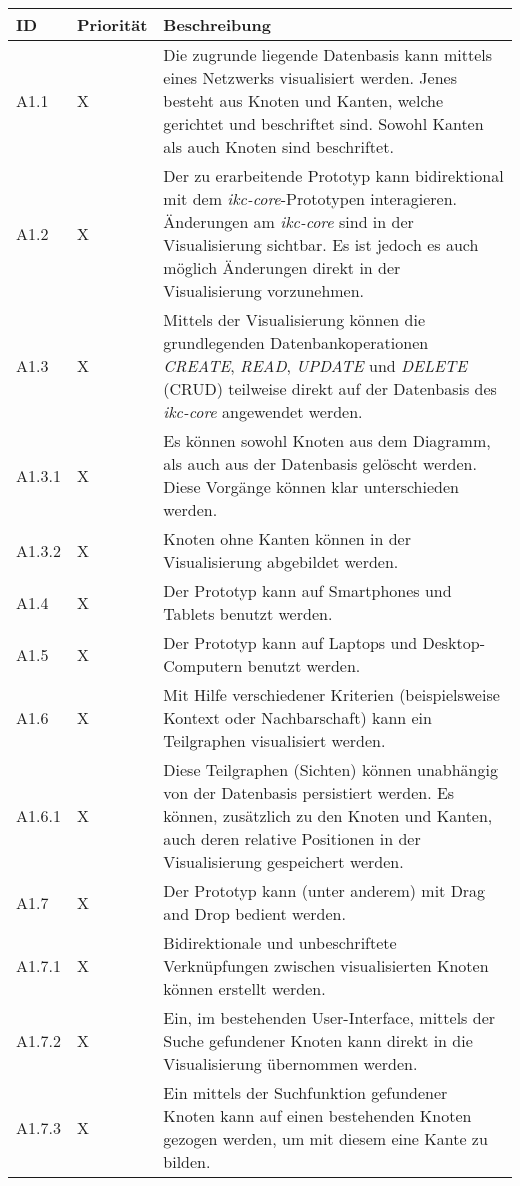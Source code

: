 \begin{longtable}{|p{1.5cm} | p{1.5cm} | p{8.1cm}|}
  \hline
    ID & Priorität & Beschreibung \\\hline
    A1.1 & X & Die zugrunde liegende Datenbasis kann mittels eines Netzwerks visualisiert werden. Jenes besteht aus Knoten und Kanten, welche gerichtet und beschriftet sind. Sowohl Kanten als auch Knoten sind beschriftet.\\\hline
    A1.2 & X & Der zu erarbeitende Prototyp kann bidirektional mit dem \textit{ikc-core}-Prototypen interagieren. Änderungen am \textit{ikc-core} sind in der Visualisierung sichtbar. Es ist jedoch es auch möglich Änderungen direkt in der Visualisierung vorzunehmen.\\\hline
    A1.3 & X & Mittels der Visualisierung können die grundlegenden Datenbankoperationen \textit{CREATE}, \textit{READ}, \textit{UPDATE} und \textit{DELETE} (CRUD) teilweise direkt auf der Datenbasis des \textit{ikc-core} angewendet werden.\\\hline
    A1.3.1 & X & Es können sowohl Knoten aus dem Diagramm, als auch aus der Datenbasis gelöscht werden. Diese Vorgänge können klar unterschieden werden.\\\hline
    A1.3.2 & X & Knoten ohne Kanten können in der Visualisierung abgebildet werden.\\\hline
    A1.4 & X & Der Prototyp kann auf Smartphones und Tablets benutzt werden.\\\hline
    A1.5 & X & Der Prototyp kann auf Laptops und Desktop-Computern benutzt werden.\\\hline    
    A1.6 & X & Mit Hilfe verschiedener Kriterien (beispielsweise Kontext oder Nachbarschaft) kann ein Teilgraphen visualisiert werden.\\\hline 
    A1.6.1 & X & Diese Teilgraphen (Sichten) können unabhängig von der Datenbasis persistiert werden. Es können, zusätzlich zu den Knoten und Kanten, auch deren relative Positionen in der Visualisierung gespeichert werden.\\\hline 
    A1.7 & X & Der Prototyp kann (unter anderem) mit Drag and Drop bedient werden.\\\hline
    A1.7.1 & X & Bidirektionale und unbeschriftete Verknüpfungen zwischen visualisierten Knoten können erstellt werden.\\\hline
    A1.7.2 & X & Ein, im bestehenden User-Interface, mittels der Suche gefundener Knoten kann direkt in die Visualisierung übernommen werden.\\\hline 
    A1.7.3 & X & Ein mittels der Suchfunktion gefundener Knoten kann auf einen bestehenden Knoten gezogen werden, um mit diesem eine Kante zu bilden.\\\hline 

\end{longtable}
